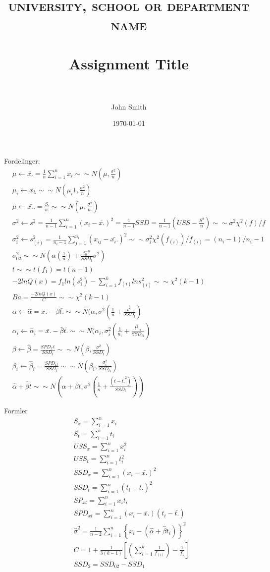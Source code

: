 \documentclass[paper=a4, fontsize=11pt]{scrartcl} %
\title{	
	\normalfont \normalsize 
	\textsc{university, school or department name} \\ [25pt] %
	\horrule{0.5pt} \\[0.4cm] %
	\huge Assignment Title \\ %
	\horrule{2pt} \\[0.5cm] %
}
\author{John Smith} %
\date{\normalsize\today} %
\numberwithin{equation}{section} %
\numberwithin{figure}{section} %
\numberwithin{table}{section} %
\begin{document}
	
	Fordelinger:
	\begin{align*}
	&\mu\leftarrow \bar{x.}=\frac{1}{n}\sum_{i=1}^{n}x_i\sim\sim N(\mu,\frac{\sigma^2}{n}) \\
	&\mu_i\leftarrow \bar{x_{i.}}\sim\sim N(\mu_i1,\frac{\sigma^2}{n}) \\
	&\mu\leftarrow \bar{x..}=\frac{S.}{n.}\sim\sim N(\mu,\frac{\sigma^2}{n.}) \\
	&\sigma^2\leftarrow s^2=\frac{1}{n-1}\sum_{i=1}^{n}(x_i-\bar{x.})^2=\frac{1}{n-1}SSD=\frac{1}{n-1}(USS-\frac{S^2}{n})\sim\sim\sigma^2\chi^2(f)/f \\
	&\sigma^2_i\leftarrow s^2_{(i)}=\frac{1}{n_i-1}\sum_{j=1}^{n_i}(x_{ij}-\bar{x_i.})^2\sim\sim\sigma^2_i\chi^2(f_{(i)})/f_{(i)}=(n_i-1)/n_i-1 \\
	&\sigma^2_{02}\sim\sim N(\alpha(\frac{1}{n})+\frac{t_0^{-n}}{SSD_t}\sigma^2) \\
	& t\sim\sim t(f_1)=t(n-1) \\
	& -2lnQ(x)=f_1ln(s_1^2)-\sum_{i=1}^{k}f_{(i)}lns^2_{(i)}\sim\sim\chi^2(k-1) \\
	& Ba=\frac{-2lnQ(x)}{C}\sim\sim\chi^2(k-1) \\
	& \alpha\leftarrow\hat{\alpha}=\bar{x.}-\bar{\beta}\bar{t.}\sim\sim N(\alpha,\sigma^2(\frac{1}{n}+\frac{\bar{t^2.}}{SSD_t}) \\
	& \alpha_i\leftarrow\hat{\alpha}_i=\bar{x.}-\bar{\beta}\bar{t.}\sim\sim N(\alpha_i,\sigma^2_i(\frac{1}{n_i}+\frac{\bar{t^2.}_i}{SSD_{ti}}) \\
	& \beta\leftarrow\hat{\beta}=\frac{SPD_xt}{SSD_t}\sim\sim N(\beta,\frac{\sigma^2}{SSD_t}) \\
	& \beta_i\leftarrow\hat{\beta}_i=\frac{SPD_{xt}}{SSD_t}\sim\sim N(\beta_i,\frac{\sigma^2_i}{SSD_{ti}}) \\
	& \hat{\alpha}+\hat{\beta}t \sim\sim N(\alpha+\beta t,\sigma^2(\frac{1}{n}+\frac{(t-\bar{t.}^2)}{SSD_t}))
	\end{align*}
	
	
	\newpage
	
	
	Formler
	\begin{align*}
	& S_x=\sum_{i=1}^{n}x_i \\
	& S_t=\sum_{i=1}^{n}t_i\\
	& USS_x=\sum_{i=1}^{n}x_i^2 \\
	& USS_t=\sum_{i=1}^{n}t_i^2 \\
	& SSD_x=\sum_{i=1}^{n}(x_i-\bar{x.})^2 \\
	& SSD_t=\sum_{i=1}^{n}(t_i-\bar{t.})^2 \\
	& SP_{xt}=\sum_{i=1}^{n}x_it_i \\
	& SPD_{xt}=\sum_{i=1}^{n}(x_i-\bar{x.})(t_i-\bar{t.}) \\
	&\hat{\sigma}^2=\frac{1}{n-2}\sum_{i=1}^{n}\left\lbrace x_i-(\hat{\alpha}+\hat{\beta}t_i)\right\rbrace ^2\\
	& C=1+\frac{1}{3(k-1)}\left[ (\sum_{i=1}^{k}\frac{1}{f_{(i)}})-\frac{1}{f_1}\right] \\ 
	& SSD_2 =SSD_{02}-SSD_1
	\end{align*}
	
\end{document}
